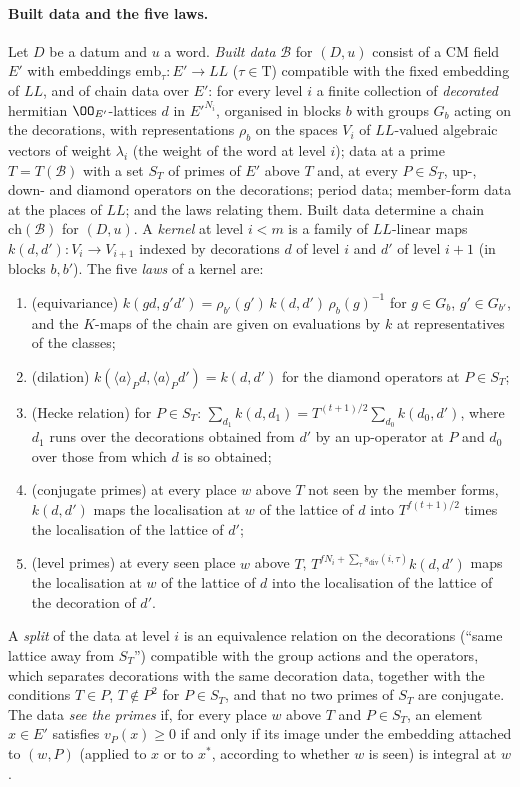 \paragraph{Built data and the five laws.}
Let $D$ be a datum and $u$ a word. \emph{Built data} $\mathcal B$ for $(D,u)$ consist of a CM field $E'$ with embeddings
$\mathrm{emb}_\tau:E'\to\mathit{LL}$ ($\tau\in\mathrm T$) compatible with the fixed embedding of $\mathit{LL}$, and of chain data
over $E'$: for every level $i$ a finite collection of \emph{decorated} hermitian $\OO_{E'}$-lattices $d$ in $E'^{N_i}$, organised in
blocks $b$ with groups $G_b$ acting on the decorations, with representations $\rho_b$ on the spaces $V_i$ of $\mathit{LL}$-valued
algebraic vectors of weight $\lambda_i$ (the weight of the word at level $i$); data at a prime $T=T(\mathcal B)$ with a set
$S_T$ of primes of $E'$ above $T$ and, at every $P\in S_T$, up-, down- and diamond operators on the decorations; period data;
member-form data at the places of $\mathit{LL}$; and the laws relating them. Built data determine a chain
$\mathrm{ch}(\mathcal B)$ for $(D,u)$. A \emph{kernel} at level $i<m$ is a family of $\mathit{LL}$-linear maps
$k(d,d'):V_i\to V_{i+1}$ indexed by decorations $d$ of level $i$ and $d'$ of level $i+1$ (in blocks $b,b'$). The five
\emph{laws} of a kernel are:
\begin{enumerate}[label=(K\arabic*)]
\item (equivariance) $k(gd,g'd')=\rho_{b'}(g')\,k(d,d')\,\rho_b(g)^{-1}$ for $g\in G_b$, $g'\in G_{b'}$, and the $K$-maps of the
chain are given on evaluations by $k$ at representatives of the classes;
\item (dilation) $k(\langle a\rangle_Pd,\langle a\rangle_Pd')=k(d,d')$ for the diamond operators at $P\in S_T$;
\item (Hecke relation) for $P\in S_T$: $\sum_{d_1}k(d,d_1)=T^{(t+1)/2}\sum_{d_0}k(d_0,d')$, where $d_1$ runs over the
decorations obtained from $d'$ by an up-operator at $P$ and $d_0$ over those from which $d$ is so obtained;
\item (conjugate primes) at every place $w$ above $T$ not seen by the member forms, $k(d,d')$ maps the localisation at $w$ of the
lattice of $d$ into $T^{f(t+1)/2}$ times the localisation of the lattice of $d'$;
\item (level primes) at every seen place $w$ above $T$, $T^{fN_i+\sum_\tau s_{\mathrm{div}}(i,\tau)}k(d,d')$ maps the localisation
at $w$ of the lattice of $d$ into the localisation of the lattice of the decoration of $d'$.
\end{enumerate}
A \emph{split} of the data at level $i$ is an equivalence relation on the decorations (``same lattice away from $S_T$'')
compatible with the group actions and the operators, which separates decorations with the same decoration data, together with
the conditions $T\in P$, $T\notin P^2$ for $P\in S_T$, and that no two primes of $S_T$ are conjugate. The data \emph{see the
primes} if, for every place $w$ above $T$ and $P\in S_T$, an element $x\in E'$ satisfies $v_P(x)\ge0$ if and only if its image
under the embedding attached to $(w,P)$ (applied to $x$ or to $x^*$, according to whether $w$ is seen) is integral at $w$.

